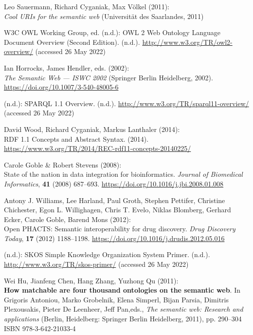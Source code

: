 \begin{thebibliography}{9}
Leo Sauermann, Richard Cyganiak, Max Völkel (2011): \\
\emph{Cool {URIs}
for the semantic web} ({Universität des Saarlandes}, 2011)

W3C OWL Working Group, ed. (n.d.): {OWL} 2 {Web Ontology Language
Document Overview} ({Second Edition}). (n.d.).
\url{http://www.w3.org/TR/owl2-overview/} (accessed 26 May 2022)

Ian Horrocks, James Hendler, eds. (2002): \\
\emph{The {Semantic Web} ---
{ISWC} 2002} ({Springer Berlin Heidelberg}, 2002).
\url{https://doi.org/10.1007/3-540-48005-6}

(n.d.): {SPARQL} 1.1 {Overview}. (n.d.).
\url{http://www.w3.org/TR/sparql11-overview/} (accessed 26 May 2022)

David Wood, Richard Cyganiak, Markus Lanthaler (2014): \\
{RDF 1.1
Concepts and Abstract Syntax}. (2014).
\url{https://www.w3.org/TR/2014/REC-rdf11-concepts-20140225/}

Carole Goble \& Robert Stevens (2008): \\
State of the nation in data
integration for bioinformatics. \emph{Journal of Biomedical
Informatics}, \textbf{41} (2008) 687--693.
\url{https://doi.org/10.1016/j.jbi.2008.01.008}

Antony J. Williams, Lee Harland, Paul Groth, Stephen Pettifer, Christine
Chichester, Egon L. Willighagen, Chris T. Evelo, Niklas Blomberg,
Gerhard Ecker, Carole Goble, Barend Mons (2012): \\
Open {PHACTS}:
Semantic interoperability for drug discovery. \emph{Drug Discovery
Today}, \textbf{17} (2012) 1188--1198.
\url{https://doi.org/10.1016/j.drudis.2012.05.016}

(n.d.): {SKOS Simple Knowledge Organization System Primer}. (n.d.).
\url{http://www.w3.org/TR/skos-primer/} (accessed 26 May 2022)

Wei Hu, Jianfeng Chen, Hang Zhang, Yuzhong Qu (2011): \\
\textbf{How
matchable are four thousand ontologies on the semantic web}. In Grigoris
Antoniou, Marko Grobelnik, Elena Simperl, Bijan Parsia, Dimitris
Plexousakis, Pieter De Leenheer, Jeff Pan,eds., \emph{The semantic
web: {Research} and applications} ({Berlin, Heidelberg}: {Springer
Berlin Heidelberg}, 2011), pp. 290--304 ISBN 978-3-642-21033-4


\end{thebibliography}
